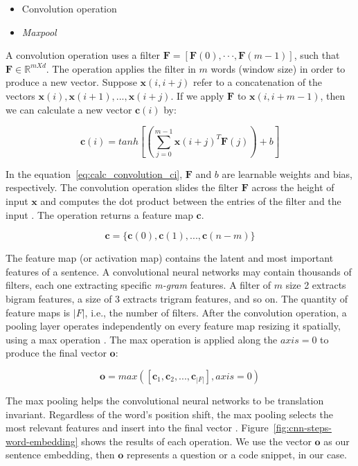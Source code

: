\documentclass[sigconf]{acmart}
\begin{document}
\begin{itemize}
    \item Convolution operation
    \item \textit{Maxpool}
\end{itemize}

A convolution operation uses a filter $\bm{F}  = [\bm{F}(0),· · ·, \bm{F}(m - 1)]$, such that $\bm{F} \in \mathbb{R}^{m X d}$. The operation applies the filter in $m$ words (window size) in order to produce a new vector. Suppose $\bm{x}(i, i + j)$ refer to a concatenation of the vectors $\bm{x}(i), \bm{x}(i + 1), . . ., \bm{x}(i + j)$. If we apply $\bm{F}$ to $\bm{x}(i, i + m - 1)$, then we can calculate a new vector $\bm{c}(i)$ by:

\begin{equation}\label{eq:calc_convolution_ci}
    \bm{c}(i) = tanh \left[\left(\sum_{j=0}^{m - 1} \bm{x}(i + j)^{T}\bm{F}(j)\right) + b\right]
\end{equation}

In the equation~\ref{eq:calc_convolution_ci}, $\bm{F}$ and $b$ are learnable weights and bias, respectively. The convolution operation slides the filter $\bm{F}$ across the height of input $\bm{x}$ and computes the dot product between the entries of the filter and the input \cite{karpathy-course-cnn-2016}. The operation returns a feature map $\bm{c}$.

\begin{equation}
    \bm{c} = \{ \bm{c}(0), \bm{c}(1), . . ., \bm{c}(n - m) \} 
\end{equation}

The feature map (or activation map) contains the latent and most important features of a sentence. A convolutional neural networks may contain thousands of filters, each one extracting specific \emph{m-gram} features. A filter of $m$ size 2 extracts bigram features, a size of 3 extracts trigram features, and so on. The quantity of feature maps is $|F|$, i.e., the number of filters. After the convolution operation, a pooling layer operates independently on every feature map resizing it spatially, using a max operation \cite{karpathy-course-cnn-2016}.  The max operation is applied along the $axis=0$ to produce the final vector $\bm{o}$:

\begin{equation}
    \bm{o} = max\left(\left[\bm{c}_{1}, \bm{c}_{2}, . . ., \bm{c}_{|F|}\right], axis = 0\right)
\end{equation}

The max pooling helps the convolutional neural networks to be translation invariant. Regardless of the word's position shift, the max pooling selects the most relevant features and insert into the final vector \citep{tom-young:trends-deep-learning-nlp}. Figure~\ref{fig:cnn-steps-word-embedding} shows the results of each operation. We use the vector $\bm{o}$ as our sentence embedding, then $\bm{o}$ represents a question or a code snippet, in our case. 
\end{document}
